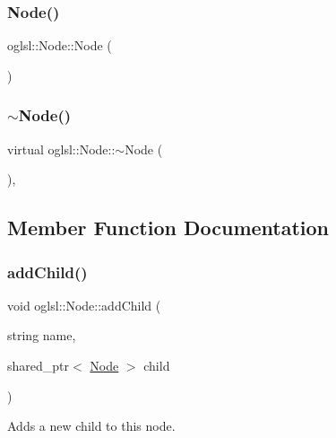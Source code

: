 \subsubsection{\texorpdfstring{Node()}{Node()}}
{\footnotesize\ttfamily oglsl\+::\+Node\+::\+Node (\begin{DoxyParamCaption}{ }\end{DoxyParamCaption})\hspace{0.3cm}{\ttfamily [default]}}

\mbox{\label{classoglsl_1_1_node_a45566d6c50af1f1676f0f11d3ef2b715}} 
\subsubsection{\texorpdfstring{$\sim$\+Node()}{~Node()}}
{\footnotesize\ttfamily virtual oglsl\+::\+Node\+::$\sim$\+Node (\begin{DoxyParamCaption}{ }\end{DoxyParamCaption})\hspace{0.3cm}{\ttfamily [virtual]}, {\ttfamily [default]}}



\subsection{Member Function Documentation}
\mbox{\label{classoglsl_1_1_node_a2429fc76cc11f2b67a9161dc12517bab}} 
\subsubsection{\texorpdfstring{add\+Child()}{addChild()}}
{\footnotesize\ttfamily void oglsl\+::\+Node\+::add\+Child (\begin{DoxyParamCaption}\item[{string}]{name,  }\item[{shared\+\_\+ptr$<$ \mbox{\hyperlink{classoglsl_1_1_node}{Node}} $>$}]{child }\end{DoxyParamCaption})\hspace{0.3cm}{\ttfamily [inline]}}



Adds a new child to this node. 

